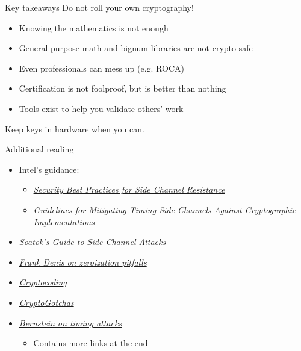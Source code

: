 \begin{frame}{Key takeaways}
  Do not roll your own cryptography!
  \begin{itemize}[<+(1)->]
    \item Knowing the mathematics is not enough
    \item General purpose math and bignum libraries are not crypto-safe
    \item Even professionals can mess up (e.g. ROCA)
    \item Certification is not foolproof, but is better than nothing
    \item Tools exist to help you validate others' work
  \end{itemize}

  \vspace*{1em}

  \pause
  Keep keys in hardware when you can.
\end{frame}

\begin{frame}{Additional reading}
  \begin{itemize}
    \item Intel's guidance:
    \begin{itemize}
      \item \href{https://www.intel.com/content/www/us/en/developer/articles/technical/software-security-guidance/secure-coding/security-best-practices-side-channel-resistance.html}{\textit{Security Best Practices for Side Channel Resistance}}
      \item \href{https://www.intel.com/content/www/us/en/developer/articles/technical/software-security-guidance/secure-coding/mitigate-timing-side-channel-crypto-implementation.html}{\textit{Guidelines for Mitigating Timing Side Channels Against Cryptographic Implementations}}
    \end{itemize}
  \end{itemize}
  
  \vspace*{0.5em}

  \begin{itemize}
    \item \href{https://soatok.blog/2020/08/27/soatoks-guide-to-side-channel-attacks/}{\textit{Soatok's Guide to Side-Channel Attacks}}
    \item \href{https://00f.net/2026/10/06/zeroization-1/}{\textit{Frank Denis on zeroization pitfalls}}
    \item \href{https://github.com/veorq/cryptocoding}{\textit{Cryptocoding}}
    \item \href{https://gotchas.salusa.dev}{\textit{CryptoGotchas}}
    \item \href{https://timing.attacks.cr.yp.to/programming.html}{\textit{Bernstein on timing attacks}}
    \par
    \begin{itemize}
      \item Contains more links at the end
    \end{itemize}
  \end{itemize}
\end{frame}


